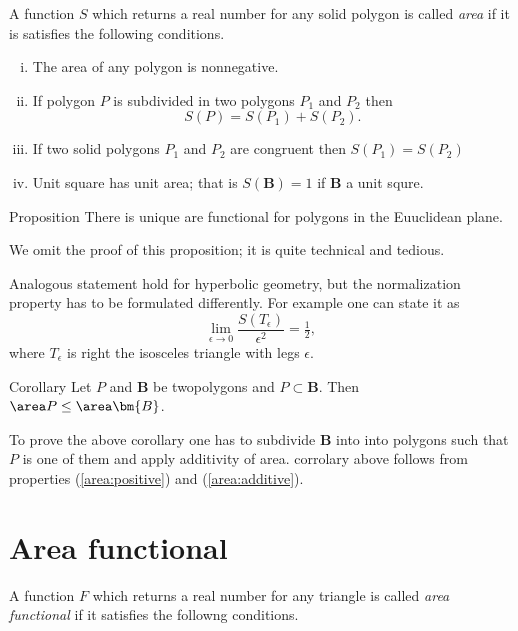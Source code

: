 A function $S$ 
which returns a real number for any solid polygon is called \emph{area}
if it is satisfies the following conditions.

\begin{enumerate}[(i)]
\item\label{area:positive} The area of any polygon is nonnegative.
\item\label{area:additive} If polygon $P$ is subdivided in two polygons $P_1$ and $P_2$ then 
\[S(P)=S(P_1)+S(P_2).\]
\item\label{area:equal} If two solid polygons $P_1$ and $P_2$ are congruent then $S(P_1)=S(P_2)$
\item\label{area:unit} Unit square has unit area; that is $S(\bm{B})=1$ if $\bm{B}$ a unit squre.
\end{enumerate}


\begin{thm}{Proposition}
There is unique are functional for polygons in the Euuclidean plane. 
\end{thm}

We omit the proof of this proposition;
it is quite technical and tedious. 

Analogous statement hold for hyperbolic geometry, but the normalization property has to be formulated differently.
For example one can state it as 
\[\lim_{\epsilon\to0}\frac{S(T_\epsilon)}{\epsilon^2}=\tfrac12,\]
where 
$T_\epsilon$ is right the isosceles triangle with legs $\epsilon$.


\begin{thm}{Corollary}
Let $P$ and $\bm{B}$ be twopolygons and $P\subset \bm{B}$.
Then $\area P\le \area \bm{B}$.
\end{thm}

To prove the above corollary one has to subdivide $\bm{B}$ into into polygons
such that $P$ is one of them and apply additivity of area.
corrolary above 
follows from properties 
(\ref{area:positive}) and (\ref{area:additive}).






\section*{Area functional}

A function $F$ which returns a real number 
for any triangle is called \emph{area functional} if it satisfies the followng conditions.


